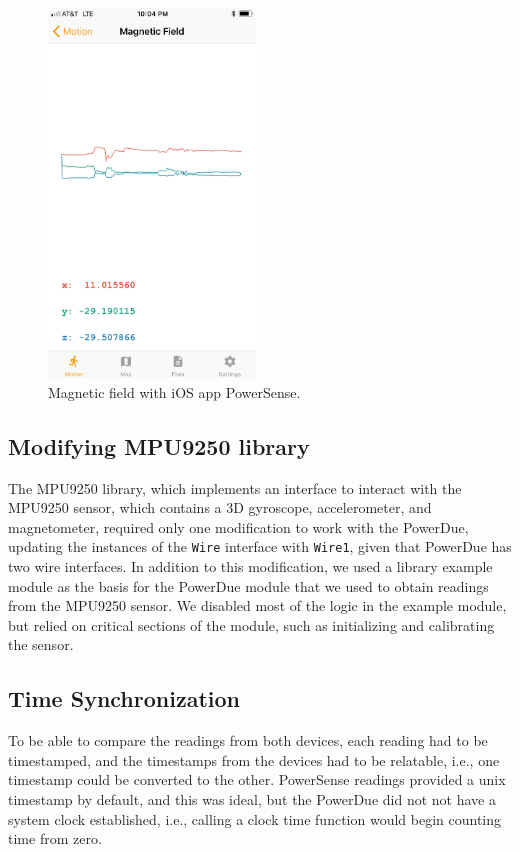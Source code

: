 \documentclass[journal]{IEEEtranTIE}
\begin{document}
\begin{figure}[!t]\centering
	\includegraphics[width=5.5cm]{magnetic_field}
	\caption{Magnetic field with iOS app PowerSense.}\label{fig:fig3}
\end{figure}

\subsection{Modifying MPU9250 library}

The MPU9250 library, which implements an interface to interact with the MPU9250
sensor, which contains a 3D gyroscope, accelerometer, and magnetometer, required
only one modification to work with the PowerDue, updating the instances of the
\texttt{Wire} interface with \texttt{Wire1}, given that PowerDue has two wire
interfaces. In addition to this modification, we used a library example module
\cite{MPU9250Ex} as the basis for the PowerDue module that we used to obtain
readings from the MPU9250 sensor. We disabled most of the logic in the example
module, but relied on critical sections of the module, such as
initializing and calibrating the sensor.

\subsection{Time Synchronization}

To be able to compare the readings from both devices, each reading had
to be timestamped, and the timestamps from the devices had to be relatable,
i.e., one timestamp could be converted to the other. PowerSense readings
provided a unix timestamp by default, and this was ideal, but the PowerDue did
not not have a system clock established, i.e., calling a clock time function
would begin counting time from zero.
\end{document}
